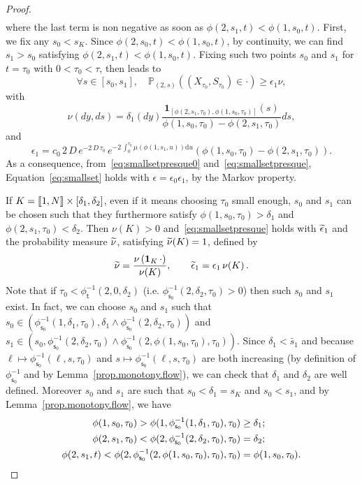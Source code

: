 \documentclass[10pt]{amsart}
\theoremstyle{definition}\newtheorem{defi}[theo]{Definition}\newtheorem{rema}[theo]{Remark}\newtheorem{exam}[theo]{Example}\newtheorem{exem}[theo]{Example}\newtheorem{nota}[theo]{Notation}
\newcommand{\llbracket}{\mathopen{[\mkern -2.7mu[}}
\newcommand{\rrbracket}{\mathclose{]\mkern -2.7mu]}}
\newcommand{\PP}{\mathbb{P}}
\newcommand{\dif}{\mathrm{d}}
\newcommand{\phit}{\phi_\textsf{t}^{-1}}
\newcommand{\phis}{\phi_{\textsf{s}_0}^{-1}}
\newcommand{\1}{\mathbf{1}}
\let\oldtilde\tilde
\renewcommand*{\tilde}[1]{\mathchoice{\widetilde{#1}}{\widetilde{#1}}{\oldtilde{#1}}{\oldtilde{#1}}}
\let\oldforall\forall
\renewcommand*{\forall}{\mathrel{\oldforall}}
\begin{document}
\begin{proof}
\begin{align*}
\end{align*}
where the last term is non negative as soon as $\phi(2,s_1,t)<\phi(1,s_0,t)$. First, we fix any $s_0<s_K$. Since $\phi(2,s_0,t)<\phi(1,s_0,t)$, by continuity, we can find $ s_1 > s_0$ satisfying $\phi(2,s_1,t)<\phi(1,s_0,t)$. Fixing such two points $s_0$ and $s_1$ for $t=\tau_0$ with $0<\tau_0<\tau$, then leads to
\begin{equation}\label{eq:smallsetpresque}
\forall s\in [s_0,s_1], \quad \PP_{(2,s)}\left((X_{\tau_0},S_{\tau_0})\in \cdot\right) \geq \epsilon_1 \nu,
\end{equation}
with
\[
\nu(dy,ds) =\delta_{1}(dy) \frac{\1_{[\phi(2,s_1,\tau_0),\phi(1,s_0,\tau_0)]} (s)}{\phi(1,s_0,\tau_0) -\phi(2,s_1,\tau_0)} ds,
\]
and
\[
\epsilon_1= c_{0} \, 2\,D \, e^{-2\,D\,\tau_0}\, e^{ - 2\,\int_0^{\tau_0}\mu (\phi(1,s_1,u)) \dif u} (\phi(1,s_0,\tau_0) -\phi(2,s_1,\tau_0)).
\]
As a consequence, from~\eqref{eq:smallsetpresque0} and~\eqref{eq:smallsetpresque}, Equation~\eqref{eq:smallset} holds with $\epsilon=\epsilon_0 \epsilon_1$, by the Markov property.


If $K = \llbracket 1, N \rrbracket \times [\delta_1, \delta_2]$, even if it means choosing $\tau_0$ small enough, $s_0$ and $s_1$ can be chosen such that they furthermore satisfy $\phi(1,s_0,\tau_0)> \delta_1$ and $\phi(2,s_1,\tau_0)< \delta_2$. Then $\nu(K)>0$ and~\eqref{eq:smallsetpresque} holds with $\tilde \epsilon_1$ and the probability measure $\tilde \nu$, satisfying $\tilde \nu(K)=1$, defined by
\[
\tilde \nu = \frac{\nu\left(\1_K\, \cdot \right)}{\nu(K)}, \qquad \tilde \epsilon_1= \epsilon_1\, \nu(K)\,.
\]
Note that if $\tau_0<\phit(2,0,\delta_2)$ (i.e. $\phis(2,\delta_2,\tau_0)>0$) then such $s_0$ and $s_1$ exist. In fact, we can choose $s_0$ and $s_1$ such that $s_0\in (\phis(1,\delta_1,\tau_0), \delta_1\wedge \phis(2,\delta_2,\tau_0))$ and $s_1\in (s_0, \phis(2,\delta_2,\tau_0)\wedge \phis(2,\phi(1,s_0,\tau_0),\tau_0))$. Since $\delta_1<\bar s_1$ and because $\ell\mapsto \phis(\ell,s,\tau_0)$ and $s\mapsto \phis(\ell,s,\tau_0)$ are both increasing (by definition of $\phis$ and by Lemma~\ref{prop.monotony.flow}), we can check that $\delta_1$ and $\delta_2$ are well defined. Moreover $s_0$ and $s_1$ are such that $s_0<\delta_1=s_K $ and $s_0<s_1$, and by Lemma~\ref{prop.monotony.flow}, we have
\begin{align*}
\phi(1,s_0,\tau_0)> \phi(1,\phis(1,\delta_1,\tau_0),\tau_0) &\geq \delta_1;
\\
\phi(2,s_1,\tau_0)<\phi(2, \phis(2,\delta_2,\tau_0), \tau_0) &=\delta_2;
\\
\phi(2,s_1,t)<\phi(2,\phis(2,\phi(1,s_0,\tau_0),\tau_0),\tau_0) &=\phi(1,s_0,\tau_0).\qedhere
\end{align*}
\end{proof}
\end{document}
